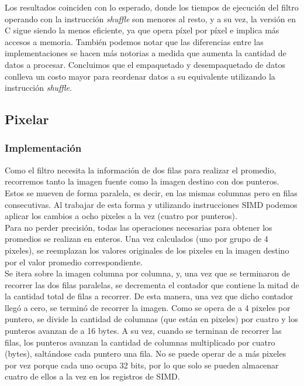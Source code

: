 \documentclass[a4paper]{article}
\begin{document}
Los resultados coinciden con lo esperado, donde los tiempos de ejecución del filtro operando con la instrucción \textit{shuffle} son menores al resto, y a su vez, la versión en C sigue siendo la menos eficiente, ya que opera píxel por píxel e implica más accesos a memoria. También podemos notar que las diferencias entre las implementaciones se hacen más notorias a medida que aumenta la cantidad de datos a procesar. Concluimos que el empaquetado y desempaquetado de datos conlleva un costo mayor para reordenar datos a su equivalente utilizando la instrucción \textit{shuffle}.

\newpage

\subsection{Pixelar}
\subsubsection{Implementación}
Como el filtro necesita la información de dos filas para realizar el promedio, recorremos tanto la imagen fuente como la imagen destino con dos punteros. Estos se mueven de forma paralela, es decir, en las mismas columnas pero en filas consecutivas. Al trabajar de esta forma y utilizando instrucciones SIMD podemos aplicar los cambios a ocho pixeles a la vez (cuatro por punteros).
\\Para no perder precisión, todas las operaciones necesarias para obtener los promedios se realizan en enteros. Una vez calculados (uno por grupo de 4 pixeles), se reemplazan los valores originales de los pixeles en la imagen destino por el valor promedio correspondiente.
\\Se itera sobre la imagen columna por columna, y, una vez que se terminaron de recorrer las dos filas paralelas, se decrementa el contador que contiene la mitad de la cantidad total de filas a recorrer. De esta manera, una vez que dicho contador llegó a cero, se terminó de recorrer la imagen. Como se opera de a 4 pixeles por puntero, se divide la cantidad de columnas (que están en pixeles) por cuatro y los punteros avanzan de a 16 bytes. A su vez, cuando se terminan de recorrer las filas, los punteros avanzan la cantidad de columnas multiplicado por cuatro (bytes), saltándose cada puntero una fila. No se puede operar de a más pixeles por vez porque cada uno ocupa 32 bits, por lo que solo se pueden almacenar cuatro de ellos a la vez en los registros de SIMD.
\\
\\
\end{document}
